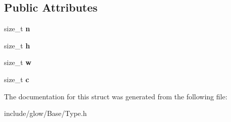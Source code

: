\subsection*{Public Attributes}
\begin{DoxyCompactItemize}
\item 
\mbox{\label{structglow_1_1_shape_n_h_w_c_aa8810bba1e0bf962f4c6e839c0113ef5}} 
size\+\_\+t {\bfseries n}
\item 
\mbox{\label{structglow_1_1_shape_n_h_w_c_aaf470f09fbea89d9657bfe198c2cefd1}} 
size\+\_\+t {\bfseries h}
\item 
\mbox{\label{structglow_1_1_shape_n_h_w_c_a3da074a7e72d1422b7a4e4cea599ee5f}} 
size\+\_\+t {\bfseries w}
\item 
\mbox{\label{structglow_1_1_shape_n_h_w_c_aa2dc43312bb79058e69cf608428b2608}} 
size\+\_\+t {\bfseries c}
\end{DoxyCompactItemize}


The documentation for this struct was generated from the following file\+:\begin{DoxyCompactItemize}
\item 
include/glow/\+Base/Type.\+h\end{DoxyCompactItemize}
